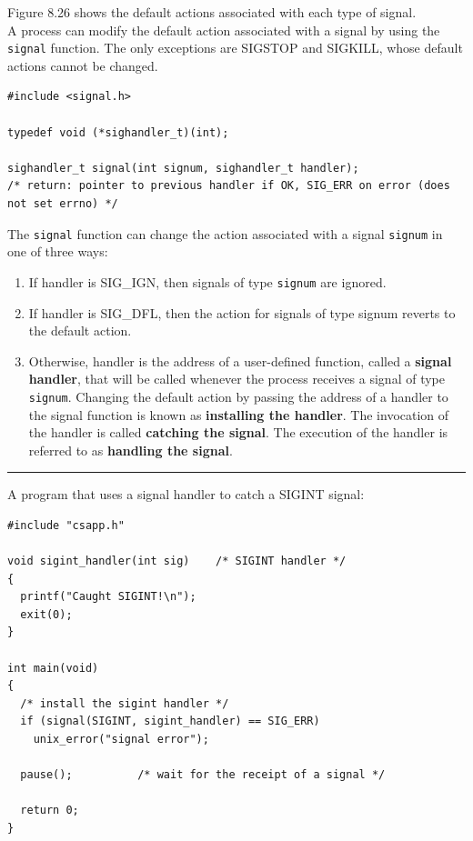 \documentclass[11pt]{article}
\begin{document}
Figure 8.26 shows the default actions associated with each type of signal.\\
A process can modify the default action associated with a signal by using the \texttt{signal} function. The only exceptions are SIGSTOP and SIGKILL, whose default actions cannot be changed.\\
\begin{verbatim}
#include <signal.h>

typedef void (*sighandler_t)(int);

sighandler_t signal(int signum, sighandler_t handler);
/* return: pointer to previous handler if OK, SIG_ERR on error (does not set errno) */
\end{verbatim}
The \texttt{signal} function can change the action associated with a signal \texttt{signum} in one of three ways:\\
\begin{enumerate}
\item If handler is SIG\_IGN, then signals of type \texttt{signum} are ignored.\\
\item If handler is SIG\_DFL, then the action for signals of type signum reverts to the default action.\\
\item Otherwise, handler is the address of a user-defined function, called a \textbf{signal handler}, that will be called whenever the process receives a signal of type \texttt{signum}. Changing the default action by passing the address of a handler to the signal function is known as \textbf{installing the handler}. The invocation of the handler is called \textbf{catching the signal}. The execution of the handler is referred to as \textbf{handling the signal}.\\
\end{enumerate}

\noindent\rule{\textwidth}{0.5pt}
A program that uses a signal handler to catch a SIGINT signal:\\
\begin{verbatim}
#include "csapp.h"

void sigint_handler(int sig)	/* SIGINT handler */
{
  printf("Caught SIGINT!\n");
  exit(0);
}

int main(void)
{
  /* install the sigint handler */
  if (signal(SIGINT, sigint_handler) == SIG_ERR)
    unix_error("signal error");

  pause();			/* wait for the receipt of a signal */

  return 0;
}

\end{verbatim}
\end{document}
